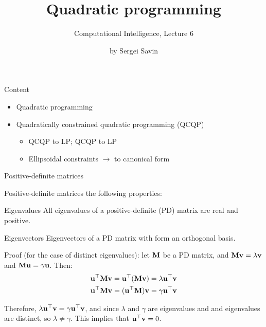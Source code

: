\documentclass{beamer}
\title{Quadratic programming}
\subtitle{Computational Intelligence, Lecture 6}
\author{by Sergei Savin}
\date{\mydate}
\begin{document}
\maketitle


\begin{frame}{Content}

\begin{itemize}
\item  Quadratic programming
\item  Quadratically constrained quadratic programming (QCQP)
	\begin{itemize}
		\item  QCQP to LP; QCQP to LP
		\item  Ellipsoidal constraints $\rightarrow$ to canonical form
	\end{itemize}
\end{itemize}

\end{frame}




\begin{frame}{Positive-definite matrices}
	\begin{flushleft}
		
		Positive-definite matrices the following properties:
		
		\begin{block}{Eigenvalues}
			All eigenvalues of a positive-definite (PD) matrix are real and positive.
		\end{block}
	
		\begin{block}{Eigenvectors}
			Eigenvectors of a PD matrix with form an orthogonal basis.
		\end{block}
	
		Proof (for the case of distinct eigenvalues): let $\mathbf{M}$ be a PD matrix, and $\mathbf{M}\mathbf{v} = \lambda \mathbf{v}$ and  $\mathbf{M}\mathbf{u} = \gamma \mathbf{u}$. Then:
		\begin{align}
			\mathbf{u}^\top\mathbf{M}\mathbf{v} = \mathbf{u}^\top(\mathbf{M}\mathbf{v})= \lambda \mathbf{u}^\top \mathbf{v} \\
			\mathbf{u}^\top\mathbf{M}\mathbf{v} = (\mathbf{u}^\top\mathbf{M})\mathbf{v}= \gamma \mathbf{u}^\top \mathbf{v}
		\end{align}
		
		Therefore, $ \lambda \mathbf{u}^\top \mathbf{v}= \gamma \mathbf{u}^\top \mathbf{v}$, and since $\lambda$ and $ \gamma$ are eigenvalues and and eigenvalues are distinct, so $\lambda \neq \gamma$. This implies that $\mathbf{u}^\top \mathbf{v} = 0$.
		
	\end{flushleft}
\end{frame}
\end{document}
